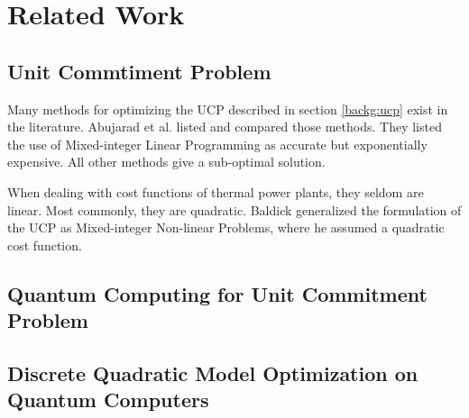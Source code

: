 \section{Related Work}

\subsection{Unit Commtiment Problem}

Many methods for optimizing the UCP described in section \ref{backg:ucp} exist in the literature.
Abujarad et al. \cite{Abujarad2017} listed and compared those methods.
They listed the use of Mixed-integer Linear Programming as accurate but exponentially expensive.
All other methods give a sub-optimal solution.
\cite{Abujarad2017}

When dealing with cost functions of thermal power plants, they seldom are linear.
Most commonly, they are quadratic.
Baldick \cite{Baldick1995} generalized the formulation of the UCP as Mixed-integer Non-linear Problems, where he assumed a quadratic cost function.

\subsection{Quantum Computing for Unit Commitment Problem}


\subsection{Discrete Quadratic Model Optimization on Quantum Computers}
